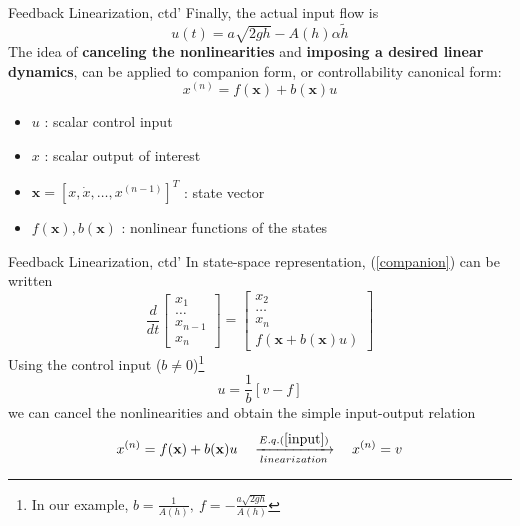 \documentclass{beamer}
\begin{document}
  \begin{frame}{Feedback Linearization, ctd'}
  Finally, the actual input flow is
  $$ u(t) = a\sqrt{2gh} - A(h)\alpha \widetilde{h} $$
    The idea of \textbf{canceling the nonlinearities} and \textbf{imposing a desired linear dynamics}, can be applied to {\color{red}companion form, or controllability canonical form}:
    \begin{equation}\label{companion}
      x^{(n)} = f(\textbf{x}) + b(\textbf{x})u
    \end{equation}
    \vspace{-20pt}
    \begin{itemize}
      \item $u$ : scalar control input
      \item $x$ : scalar output of interest
      \item $\textbf{x} = \left[ x,\dot{x},\dots,x^{(n-1)}\right]^{T}$ : state vector
      \item $f(\textbf{x}), b(\textbf{x})$ : nonlinear functions of the states
    \end{itemize}
  \end{frame}


  \begin{frame}{Feedback Linearization, ctd'}
  In state-space representation, (\ref{companion}) can be written
  $$
  \frac{d}{dt}\left[\begin{array}{c}
                      x_{1} \\
                      \dots \\
                      x_{n-1} \\
                      x_{n}
                    \end{array}\right] = \left[\begin{array}{c}
                                                 x_{2} \\
                                                 \dots \\
                                                 x_{n} \\
                                                 f(\textbf{x}+b(\textbf{x})u)
                                               \end{array}\right]
  $$
  Using the control input ($b \neq 0$)\footnote{In our example, $b=\frac{1}{A(h)}, ~ f=-\frac{a\sqrt{2gh}}{A(h)}$}
  \begin{equation}\label{input}
    u = \frac{1}{b}\left[v-f\right]
  \end{equation}
  we can cancel the nonlinearities and obtain the simple input-output relation
  $$ x^{(n)} = f(\textbf{x}) + b(\textbf{x})u \quad \xrightarrow[linearization]{E.q.(\ref{input})} \quad x^{(n)} = v $$
  \end{frame}
\end{document}

